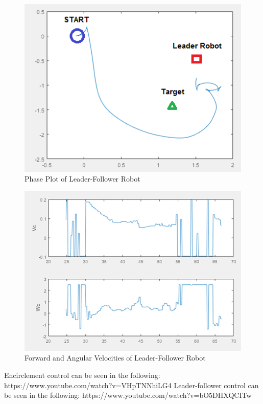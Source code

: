 \begin{figure}[htbp]
\begin{center}
\includegraphics[width=5in]{13}
\caption{Phase Plot of Leader-Follower Robot} \label{fig:13}
\end{center}
\end{figure}

\begin{figure}[htbp]
\begin{center}
\includegraphics[width=5in]{14}
\caption{Forward and Angular Velocities of Leader-Follower Robot} \label{fig:14}
\end{center}
\end{figure}

Encirclement control can be seen in the following: https://www.youtube.com/watch?v=VHpTNNhiLG4
Leader-follower control can be seen in the following: https://www.youtube.com/watch?v=bO5DHXQCITw


